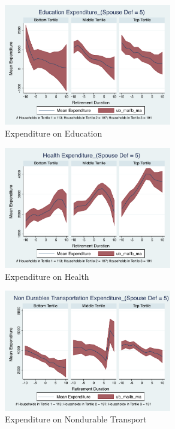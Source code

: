 \documentclass[11pt,onecolumn]{article}
\numberwithin{figure}{section}
\begin{document}
\begin{figure}[h]
	\caption{Expenditure on Education}
	\centering
	\includegraphics[width=0.65\textwidth]{../ConsumptionPostRetirement_by_SpouseDef_Cats/Smoothed/5/spouse_def_total_education_real.pdf}
\end{figure}
\clearpage

\begin{figure}[h]
	\caption{Expenditure on Health}
	\centering
	\includegraphics[width=0.65\textwidth]{../ConsumptionPostRetirement_by_SpouseDef_Cats/Smoothed/5/spouse_def_total_healthexpense_real.pdf}
\end{figure}


\begin{figure}[h]
	\caption{Expenditure on Nondurable Transport}
	\centering
	\includegraphics[width=0.65\textwidth]{../ConsumptionPostRetirement_by_SpouseDef_Cats/Smoothed/5/spouse_def_total_transport_real.pdf}
\end{figure}
\clearpage
\end{document}
